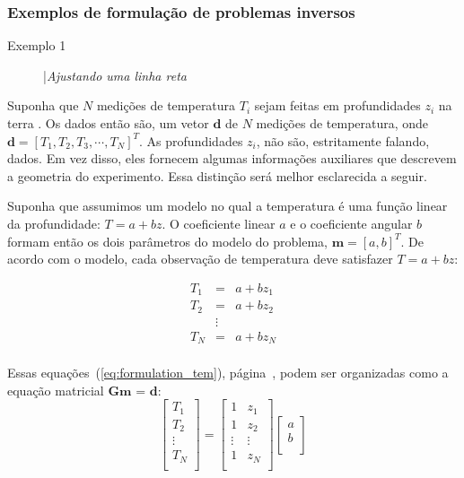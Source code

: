 \documentclass[a4paper, 12 pt]{article} %
\begin{document}

\subsubsection{Exemplos de formulação de problemas inversos}

\begin{description}
	\item[Exemplo 1] |\textit{Ajustando uma linha reta} 
\end{description}

Suponha que $N$ medições de temperatura $T_{i}$ sejam feitas em profundidades $z_{i}$ na terra \citep{menke1984geophysical}. Os dados então são, um vetor $\textbf{d}$ de $N$ medições de
temperatura, onde $\textbf{d} = [T_{1}, T_{2}, T_{3}, \cdots, T_{N}]^T$. As profundidades $z_{i}$, não são, estritamente falando, dados. Em vez disso, eles fornecem algumas informações auxiliares que descrevem a geometria do experimento. Essa distinção será melhor esclarecida a seguir.

Suponha que assumimos um modelo no qual a temperatura é uma função linear da profundidade: $T = a + bz$. O coeficiente linear $a$ e o coeficiente angular $b$ formam então os dois parâmetros do modelo do problema, $\textbf{m} = [a, b]^T$. De acordo com o modelo, cada observação de temperatura deve satisfazer $T = a + bz$: 

\begin{equation}\label{eq:formulation_tem}
\begin{matrix}
T_{1} &=& a + bz_{1} \\
T_{2} &=& a + bz_{2} \\
&\vdots \\
T_{N} &=& a + bz_{N} \\
\end{matrix}
\end{equation}

Essas equações~(\ref{eq:formulation_tem}), página~\pageref{eq:formulation_tem}, podem ser organizadas como a equação matricial $\textbf{Gm = d}$: \\

\begin{equation}\label{eq:matriz_temperatura}
\begin{bmatrix}
T_{1} \\
T_{2} \\
\vdots \\
T_{N}\\
\end{bmatrix} = 
\begin{bmatrix}
1 & z_{1} \\
1 &	z_{2} \\
\vdots & \vdots \\
1 & z_{N} \\
\end{bmatrix}
\begin{bmatrix}
a \\
b \\
\end{bmatrix}
\end{equation} \\
\end{document}
